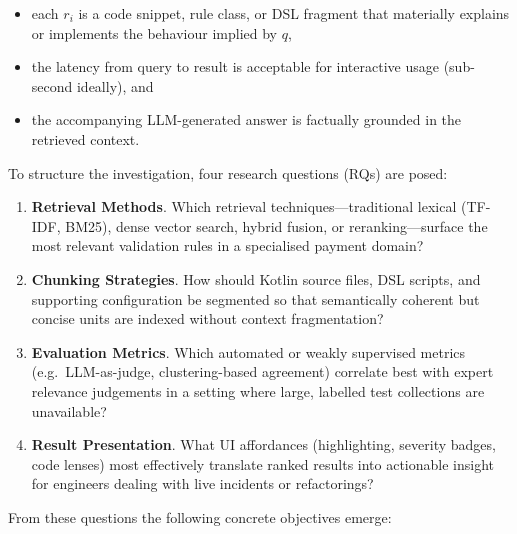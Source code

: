 \begin{itemize}
    \item each $r_i$ is a code snippet, rule class, or DSL fragment that materially explains or implements the behaviour implied by $q$,
    \item the latency from query to result is acceptable for interactive usage (sub-second ideally), and
    \item the accompanying LLM-generated answer is factually grounded in the retrieved context.
\end{itemize}

To structure the investigation, four research questions (RQs) are posed:

\begin{enumerate}[label=\textbf{RQ\arabic*:}, leftmargin=2.5em]
    \item \textbf{Retrieval Methods}. Which retrieval techniques—traditional lexical (TF-IDF, BM25), dense vector search, hybrid fusion, or reranking—surface the most relevant validation rules in a specialised payment domain?
    \item \textbf{Chunking Strategies}. How should Kotlin source files, DSL scripts, and supporting configuration be segmented so that semantically coherent but concise units are indexed without context fragmentation?
    \item \textbf{Evaluation Metrics}. Which automated or weakly supervised metrics (e.g.\ LLM-as-judge, clustering-based agreement) correlate best with expert relevance judgements in a setting where large, labelled test collections are unavailable?
    \item \textbf{Result Presentation}. What UI affordances (highlighting, severity badges, code lenses) most effectively translate ranked results into actionable insight for engineers dealing with live incidents or refactorings?
\end{enumerate}

From these questions the following concrete objectives emerge:


